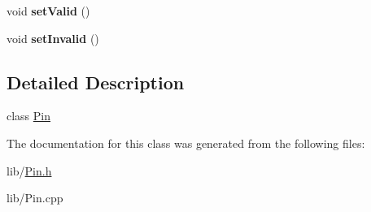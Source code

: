\begin{DoxyCompactItemize}
\item 
void {\bfseries set\+Valid} ()\hypertarget{classliberamox_1_1Pin_a4aa3e215e0d546f9a0a1d33e2769d581}{}\label{classliberamox_1_1Pin_a4aa3e215e0d546f9a0a1d33e2769d581}

\item 
void {\bfseries set\+Invalid} ()\hypertarget{classliberamox_1_1Pin_a05ee0d794488706800cdb71b32262a31}{}\label{classliberamox_1_1Pin_a05ee0d794488706800cdb71b32262a31}

\end{DoxyCompactItemize}


\subsection{Detailed Description}
class \hyperlink{classliberamox_1_1Pin}{Pin} 

The documentation for this class was generated from the following files\+:\begin{DoxyCompactItemize}
\item 
lib/\hyperlink{Pin_8h}{Pin.\+h}\item 
lib/Pin.\+cpp\end{DoxyCompactItemize}
